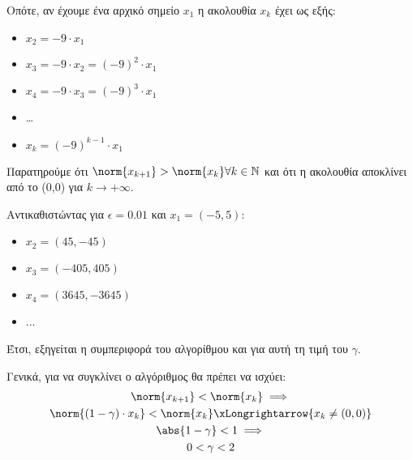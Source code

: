 \begin{enumerate}[i)]
	Οπότε, αν έχουμε ένα αρχικό σημείο $x_1$ η ακολουθία $x_k$ έχει ως εξής:
	\begin{itemize}
		\item $x_2 = -9 \cdot x_1$
		\item $x_3 = -9 \cdot x_2 = (-9)^2 \cdot x_1$
		\item $x_4 = -9 \cdot x_3 = (-9)^3 \cdot x_1$
		\item \ldots
		\item $x_k = (-9)^{k-1} \cdot x_1$
	\end{itemize}
	Παρατηρούμε ότι $\norm{x_{k+1}} > \norm{x_{k}} \forall k \in \mathbb{N}$ και ότι η ακολουθία αποκλίνει από το (0,0) για $k \to +\infty$.
	
	Αντικαθιστώντας για $\epsilon = 0.01$ και $x_1 = (-5, 5)$:
	\begin{itemize}
		\item $x_2 = (45, -45)$
		\item $x_3 = (-405, 405)$
		\item $x_4 = (3645, -3645)$
		\item ...
	\end{itemize}
	Έτσι, εξηγείται η συμπεριφορά του αλγορίθμου και για αυτή τη τιμή του $\gamma$.
\end{enumerate}

\hfill \break
\hfill \break
Γενικά, για να συγκλίνει ο αλγόριθμος θα πρέπει να ισχύει:
\begin{gather*}
	\norm{x_{k+1}} < \norm{x_k} \implies\\
	\norm{(1 - \gamma) \cdot x_k} < \norm{x_k} \xLongrightarrow{x_k \neq (0,0)}\\
	\abs{1 - \gamma} < 1 \implies\\
	0 < \gamma < 2
\end{gather*}